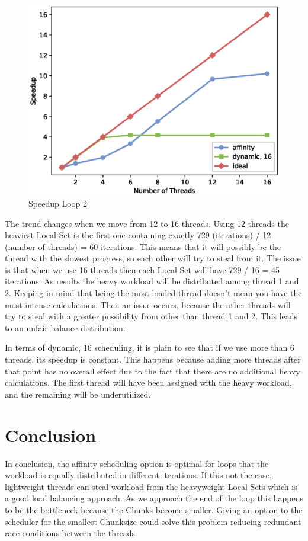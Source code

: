 \documentclass[12pt,a4paper]{article}
\newcommand{\sectionVspacing}{\vspace{15pt}}
\begin{document}
\begin{figure}[ht]
	\centering
	\includegraphics[scale=0.6]{../graphs/loop2_speedup.eps}
	\caption{Speedup Loop 2}
	\label{speedupLoop2}
\end{figure}

The trend changes when we move from 12 to 16 threads. Using 12 threads the heaviest Local Set is the first one containing exactly 729 (iterations) / 12 (number of threads) = 60 iterations. This means that it will possibly be the thread with the slowest progress, so each other will try to steal from it. The issue is that when we use 16 threads then each Local Set will have 729 / 16 = 45 iterations. As results the heavy workload will be distributed among thread 1 and 2. Keeping in mind that being the most loaded thread doesn't mean you have the most intense calculations. Then an issue occurs, because the other threads will try to steal with a greater possibility from other than thread 1 and 2. This leads to an unfair balance distribution.

In terms of dynamic, 16 scheduling, it is plain to see that if we use more than 6 threads, its speedup is constant. This happens because adding more threads after that point has no overall effect due to the fact that there are no additional heavy calculations. The first thread will have been assigned with the heavy workload, and the remaining will be underutilized.

\sectionVspacing

\section{Conclusion}
In conclusion, the affinity scheduling option is optimal for loops that the workload is equally distributed in different iterations. If this not the case, lightweight threads can steal workload from the heavyweight Local Sets which is a good load balancing approach. As we approach the end of the loop this happens to be the bottleneck because the Chunks become smaller. Giving an option to the scheduler for the smallest Chunksize could solve this problem reducing redundant race conditions between the threads.
\end{document}
